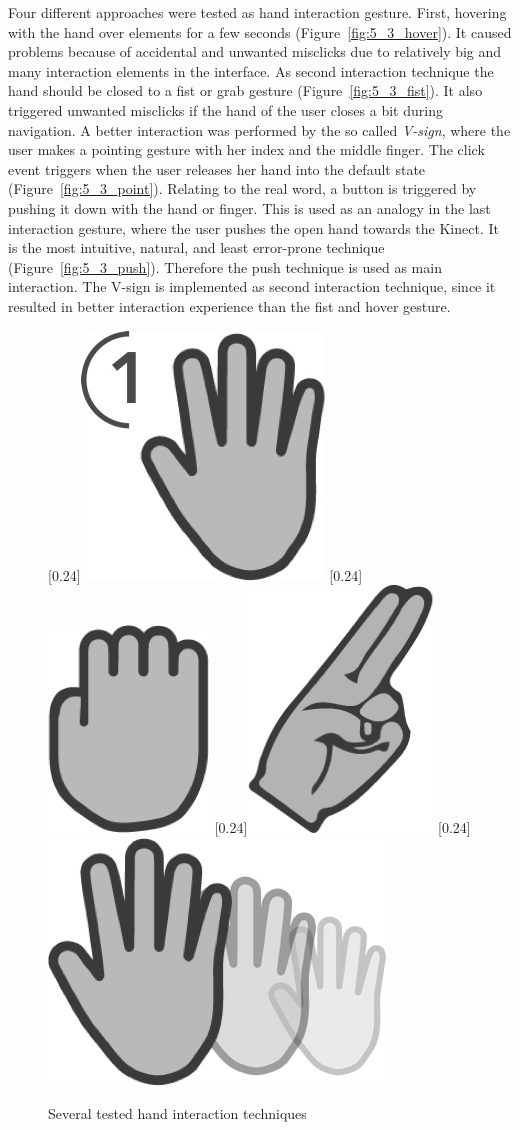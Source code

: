 Four different approaches were tested as hand interaction gesture.
First, hovering with the hand over elements for a few seconds (Figure~\ref{fig:5_3_hover}).
It caused problems because of accidental and unwanted misclicks due to relatively big and many interaction elements in the interface.
As second interaction technique the hand should be closed to a fist or grab gesture (Figure~\ref{fig:5_3_fist}).
It also triggered unwanted misclicks if the hand of the user closes a bit during navigation.
A better interaction was performed by the so called \textit{V-sign}, where the user makes a pointing gesture with her index and the middle finger.
The click event triggers when the user releases her hand into the default state (Figure~\ref{fig:5_3_point}).
Relating to the real word, a button is triggered by pushing it down with the hand or finger.
This is used as an analogy in the last interaction gesture, where the user pushes the open hand towards the Kinect.
It is the most intuitive, natural, and least error-prone technique (Figure~\ref{fig:5_3_push}). %
Therefore the push technique is used as main interaction. The V-sign is implemented as second interaction technique, since it resulted in better interaction experience than the fist and hover gesture.
\begin{figure}[htb]
	\centering
		[0.24\linewidth]{\includegraphics[width=0.12\linewidth]{Pictures/5_3_hover}}
		[0.24\linewidth]{\includegraphics[width=0.08\linewidth]{Pictures/5_3_fist}}
		[0.24\linewidth]{\includegraphics[width=0.097\linewidth]{Pictures/5_3_point}}
		[0.24\linewidth]{\includegraphics[width=0.176\linewidth]{Pictures/5_3_push2}}
	\caption{Several tested hand interaction techniques}%
	\label{fig:5_3_handInteraction}
\end{figure}

